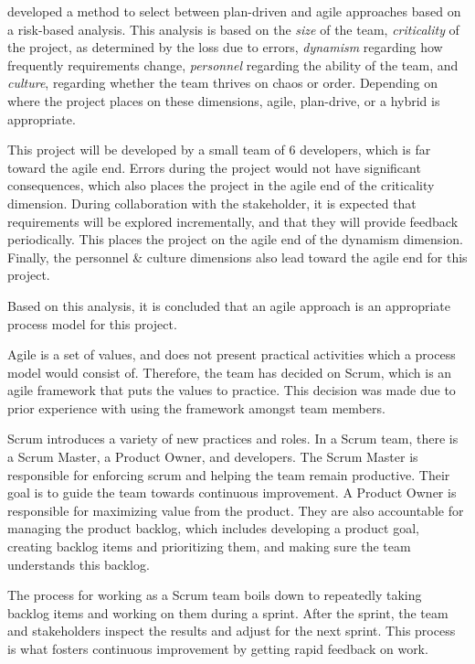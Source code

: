  developed a method to select between plan-driven and agile approaches based on a risk-based analysis.
This analysis is based on the \textit{size} of the team, \textit{criticality} of the project, as determined by the loss due to errors, \textit{dynamism} regarding how frequently requirements change, \textit{personnel} regarding the ability of the team, and \textit{culture}, regarding whether the team thrives on chaos or order. Depending on where the project places on these dimensions, agile, plan-drive, or a hybrid is appropriate.

This project will be developed by a small team of 6 developers, which is far toward the agile end.
Errors during the project would not have significant consequences, which also places the project in the agile end of the criticality dimension.
During collaboration with the stakeholder, it is expected that requirements will be explored incrementally, and that they will provide feedback periodically. This places the project on the agile end of the dynamism dimension.
Finally, the personnel \& culture dimensions also lead toward the agile end for this project.\cite{boehmObservationsBalancingDiscipline}

Based on this analysis, it is concluded that an agile approach is an appropriate process model for this project.

Agile is a set of values, and does not present practical activities which a process model would consist of. Therefore, the team has decided on Scrum, which is an agile framework that puts the values to practice. This decision was made due to prior experience with using the framework amongst team members.

Scrum introduces a variety of new practices and roles. In a Scrum team, there is a Scrum Master, a Product Owner, and developers. The Scrum Master is responsible for enforcing scrum and helping the team remain productive. Their goal is to guide the team towards continuous improvement. A Product Owner is responsible for maximizing value from the product. They are also accountable for managing the product backlog, which includes developing a product goal, creating backlog items and prioritizing them, and making sure the team understands this backlog.

The process for working as a Scrum team boils down to repeatedly taking backlog items and working on them during a sprint. After the sprint, the team and stakeholders inspect the results and adjust for the next sprint. This process is what fosters continuous improvement by getting rapid feedback on work.

